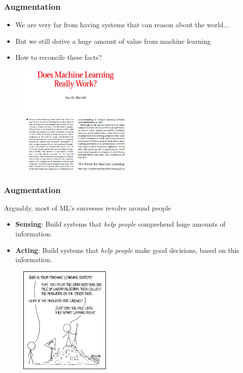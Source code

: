 \documentclass[10pt,mathserif]{beamer}
\begin{document}
\begin{frame}
  \frametitle{Augmentation}
  \begin{itemize}
  \item We are very far from having systems that can reason about the world...
  \item But we still derive a huge amount of value from machine learning
  \item How to reconcile these facts?
  \end{itemize}
\begin{figure}[ht]
  \centering
  \includegraphics[width=0.5\textwidth]{figures/does_it_work}
\end{figure}

\end{frame}

\begin{frame}
  \frametitle{Augmentation}
  Arguably, most of ML's successes revolve around people
  \begin{itemize}
    \item \textbf{Sensing}: Build systems that \textit{help people} comprehend
      huge amounts of information.
    \item \textbf{Acting}: Build systems that \textit{help people} make good
      decisions, based on this information.
  \end{itemize}
  \begin{figure}[ht]
    \centering
    \includegraphics[width=0.4\textwidth]{figures/augmentation}
  \end{figure}
\end{frame}
\end{document}
